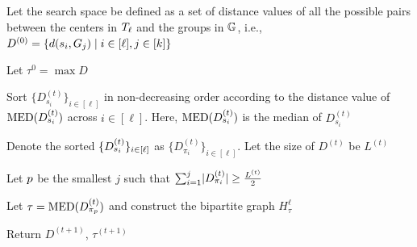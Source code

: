 \documentclass{article}
\begin{document}
\begin{algorithm}[]
    \SetAlgoNoEnd
    \caption{\findlambda}
    \label{alg:finding-lambda-ell}
    \SetAlgoLined
    \KwOut{$\lambda_{\ell}$}
    
    Let the search space be defined as a set of distance values of all the possible pairs between the centers in $T_{\ell}$ and the groups in $\mathbb{G}$, i.e., $D^{(0)} = \{d(s_i, G_j) \mid i \in [\ell], j \in [k]\}$

    Let $\tau^{0} = \max D $ 


\end{algorithm}



\begin{algorithm}[h]
\SetAlgoNoEnd
    \caption{The Median of Medians $\mom(D^{(t)})$}
    \label{alg:median-median}
    \SetAlgoLined

    Sort $\{D_{s_i}^{(t)}\}_{i \in [\ell]}$ in non-decreasing order according to the distance value of $\operatorname{MED}(D_{s_i}^{(t)})$ across $i \in [\ell]$. Here, $\operatorname{MED}(D_{s_i}^{(t)})$ is the median of $D_{s_i}^{(t)}$

    Denote the sorted $\{D_{s_i}^{(t)}\}_{i \in [\ell]}$ as $\{D_{\pi_i}^{(t)}\}_{i \in [\ell]}$.
    Let the size of $D^{(t)}$ be $L^{(t)}$



    Let $p$ be the smallest $j$ such that $\sum_{i=1}^{j} \lvert D_{\pi_{i}}^{(t)} \rvert  \geq \frac{L^{(t)}}{2}$ 



    Let $\tau = \operatorname{MED}(D_{\pi_{p}}^{(t)})$ and construct the bipartite graph $H^{\ell}_{\tau}$ \label{algo:find-pivot}

    Return $D^{(t+1)}$, $\tau^{(t+1)}$
\end{algorithm}
\end{document}
